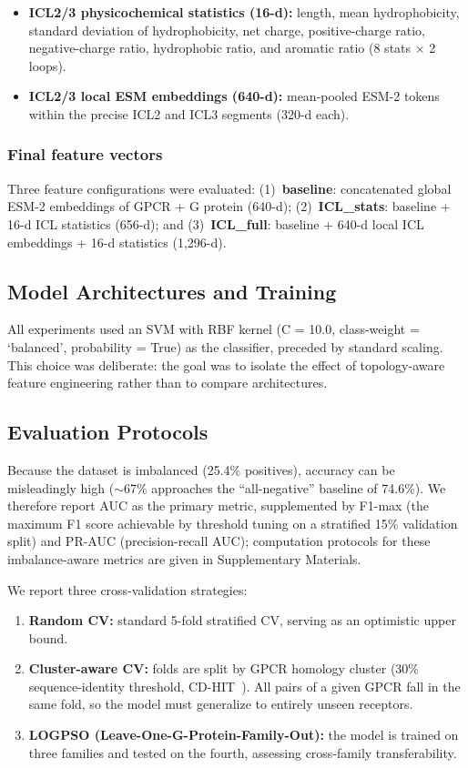 \documentclass[11pt,a4paper]{article}
\begin{document}
\begin{itemize}
    \item \textbf{ICL2/3 physicochemical statistics (16-d):} length, mean hydrophobicity, standard deviation of hydrophobicity, net charge, positive-charge ratio, negative-charge ratio, hydrophobic ratio, and aromatic ratio (8 stats $\times$ 2 loops).
    \item \textbf{ICL2/3 local ESM embeddings (640-d):} mean-pooled ESM-2 tokens within the precise ICL2 and ICL3 segments (320-d each).
\end{itemize}

\subsubsection{Final feature vectors}

Three feature configurations were evaluated: (1)~\textbf{baseline}: concatenated global ESM-2 embeddings of GPCR + G protein (640-d); (2)~\textbf{ICL\_stats}: baseline + 16-d ICL statistics (656-d); and (3)~\textbf{ICL\_full}: baseline + 640-d local ICL embeddings + 16-d statistics (1,296-d).

\subsection{Model Architectures and Training}

All experiments used an SVM with RBF kernel (C = 10.0, class-weight = `balanced', probability = True) as the classifier, preceded by standard scaling. This choice was deliberate: the goal was to isolate the effect of topology-aware feature engineering rather than to compare architectures.

\subsection{Evaluation Protocols}

Because the dataset is imbalanced (25.4\% positives), accuracy can be misleadingly high ($\sim$67\% approaches the ``all-negative'' baseline of 74.6\%). We therefore report AUC as the primary metric, supplemented by F1-max (the maximum F1 score achievable by threshold tuning on a stratified 15\% validation split) and PR-AUC (precision-recall AUC); computation protocols for these imbalance-aware metrics are given in Supplementary Materials.

We report three cross-validation strategies:

\begin{enumerate}
    \item \textbf{Random CV:} standard 5-fold stratified CV, serving as an optimistic upper bound.
    \item \textbf{Cluster-aware CV:} folds are split by GPCR homology cluster (30\% sequence-identity threshold, CD-HIT~\cite{li2006cdhit}). All pairs of a given GPCR fall in the same fold, so the model must generalize to entirely unseen receptors.
    \item \textbf{LOGPSO (Leave-One-G-Protein-Family-Out):} the model is trained on three families and tested on the fourth, assessing cross-family transferability.
\end{enumerate}
\end{document}
